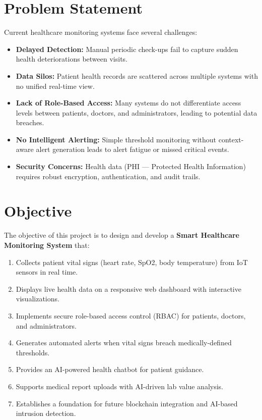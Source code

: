 \documentclass[12pt,a4paper]{report}
\begin{document}
\section{Problem Statement}
Current healthcare monitoring systems face several challenges:
\begin{itemize}[leftmargin=*]
    \item \textbf{Delayed Detection:} Manual periodic check-ups fail to capture sudden health deteriorations between visits.
    \item \textbf{Data Silos:} Patient health records are scattered across multiple systems with no unified real-time view.
    \item \textbf{Lack of Role-Based Access:} Many systems do not differentiate access levels between patients, doctors, and administrators, leading to potential data breaches.
    \item \textbf{No Intelligent Alerting:} Simple threshold monitoring without context-aware alert generation leads to alert fatigue or missed critical events.
    \item \textbf{Security Concerns:} Health data (PHI --- Protected Health Information) requires robust encryption, authentication, and audit trails.
\end{itemize}

\section{Objective}
The objective of this project is to design and develop a \textbf{Smart Healthcare Monitoring System} that:
\begin{enumerate}[leftmargin=*]
    \item Collects patient vital signs (heart rate, SpO2, body temperature) from IoT sensors in real time.
    \item Displays live health data on a responsive web dashboard with interactive visualizations.
    \item Implements secure role-based access control (RBAC) for patients, doctors, and administrators.
    \item Generates automated alerts when vital signs breach medically-defined thresholds.
    \item Provides an AI-powered health chatbot for patient guidance.
    \item Supports medical report uploads with AI-driven lab value analysis.
    \item Establishes a foundation for future blockchain integration and AI-based intrusion detection.
\end{enumerate}
\end{document}
